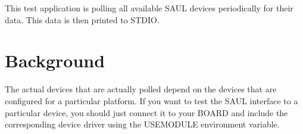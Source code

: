 This test application is polling all available S\+A\+UL devices periodically for their data. This data is then printed to S\+T\+D\+IO.

\section*{Background }

The actual devices that are actually polled depend on the devices that are configured for a particular platform. If you want to test the S\+A\+UL interface to a particular device, you should just connect it to your B\+O\+A\+RD and include the corresponding device driver using the {\ttfamily U\+S\+E\+M\+O\+D\+U\+LE} environment variable. 